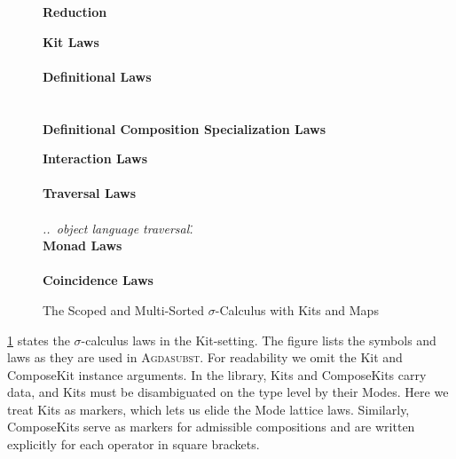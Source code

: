 \documentclass[screen,nonacm]{acmart}
\begin{document}
\begin{figure}[tp]
      {\raggedright{} \vspace{2.0em} \textbf{\Large Reduction} \par}
      \vspace{1.5em}
      \begin{minipage}[t]{0.40\textwidth}
            \small{}
            \raggedright{}
            \textbf{Kit Laws}\\
            \ETypeLevel{}\\
            \vspace{0.5em}
            \textbf{Definitional Laws}\\
            \vspace{0.5em}
            \EDefLawTy{}\\
            \vspace{0.5em}
            \EDefLaw{}\\
            \vspace{0.5em}
            \textbf{Definitional Composition Specialization Laws}
            \ESpecialDefLaws{}
      \end{minipage}
      \hfill
      \begin{minipage}[t]{0.54\textwidth}
            \small{}
            \raggedright{}
            \textbf{Interaction Laws}\\
            \EInteraction{}\\
            \vspace{0.5em}
            \textbf{Traversal Laws}\\
            \ETravL{}\\
            \emph{..\ object language traversal\..}\\
            \vspace{0.5em}
            \textbf{Monad Laws}\\
            \EMonad{}\\
            \vspace{0.5em}
            \textbf{Coincidence Laws}\\
            \ECoincidence{}
      \end{minipage}
      \caption{The Scoped and Multi-Sorted $σ$-Calculus with Kits and Maps}\label{fig:ags-fin}
\end{figure}

\cref{fig:ags-fin} states the $σ$-calculus laws in the Kit-setting.
The figure lists the symbols and laws as they are used in \textsc{Agdasubst}.
For readability we omit the Kit and ComposeKit instance arguments. In the
library, Kits and ComposeKits carry data, and Kits must be disambiguated on the
type level by their Modes. Here we treat Kits as markers, which lets us elide
the Mode lattice laws. Similarly, ComposeKits serve as markers for admissible
compositions and are written explicitly for each operator in square brackets.
\end{document}
